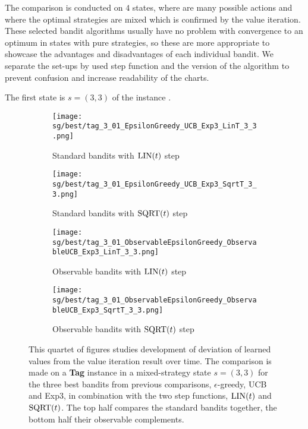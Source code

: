 \documentclass[../main.tex]{subfiles}
\begin{document}
The comparison is conducted on $4$ states, where are many possible actions and where the optimal strategies are mixed which is confirmed by the value iteration.
These selected bandit algorithms usually have no problem with convergence to an optimum in states with pure strategies, so these are more appropriate to showcase the advantages and disadvantages of each individual bandit.
We separate the set-ups by used step function and the version of the algorithm to prevent confusion and increase readability of the charts.

The first state is $s = \left(3, 3\right)$ of the instance  .
\begin{figure}[ht]
    \begin{subfigure}[t]{0.45\linewidth}
        \texttt{[image: sg/best/tag\_3\_01\_EpsilonGreedy\_UCB\_Exp3\_LinT\_3\_3.png]}
        \caption{Standard bandits with $\text{LIN}(t)$ step}
        \label{exp:sg:best:301:33:std:lin}
    \end{subfigure}
    \hfill
    \begin{subfigure}[t]{0.45\linewidth}
        \texttt{[image: sg/best/tag\_3\_01\_EpsilonGreedy\_UCB\_Exp3\_SqrtT\_3\_3.png]}
        \caption{Standard bandits with $\text{SQRT}(t)$ step}
        \label{exp:sg:best:301:33:std:sqrt}
    \end{subfigure}
    \begin{subfigure}[t]{0.45\linewidth}
        \texttt{[image: sg/best/tag\_3\_01\_ObservableEpsilonGreedy\_ObservableUCB\_Exp3\_LinT\_3\_3.png]}
        \caption{Observable bandits with $\text{LIN}(t)$ step}
        \label{exp:sg:best:301:33:obs:lint}
    \end{subfigure}
    \hfill
    \begin{subfigure}[t]{0.45\linewidth}
        \texttt{[image: sg/best/tag\_3\_01\_ObservableEpsilonGreedy\_ObservableUCB\_Exp3\_SqrtT\_3\_3.png]}
        \caption{Observable bandits with $\text{SQRT}(t)$ step}
        \label{exp:sg:best:301:33:obs:sqrt}
    \end{subfigure}
    \caption[Comparison of three best bandits and their observable counterparts on ]{
        This quartet of figures studies development of deviation of learned values from the value iteration result over time.
        The comparison is made on a \textbf{Tag} instance  in a mixed-strategy state $s = \left(3, 3\right)$ for the three best bandits from previous comparisons, $\epsilon$-greedy, UCB and Exp3, in combination with the two step functions, $\text{LIN}(t)$ and $\text{SQRT}(t)$.
        The top half compares the standard bandits together, the bottom half their observable complements.
    }
    \label{exp:sg:best:301:33}
\end{figure}
\end{document}
